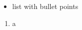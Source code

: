 

\begin{itemize}
	\item list with bullet points
\end{itemize}

\begin{enumerate}
	\item a
\end{enumerate}

